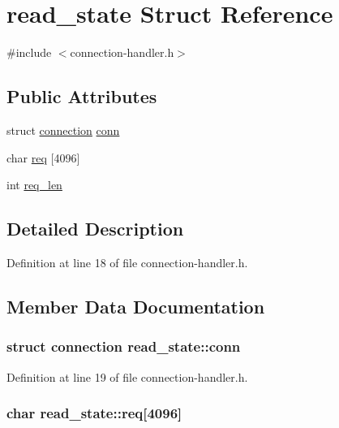 \hypertarget{structread__state}{\section{read\-\_\-state Struct Reference}
\label{structread__state}
}


{\ttfamily \#include $<$connection-\/handler.\-h$>$}

\subsection*{Public Attributes}
\begin{DoxyCompactItemize}
\item 
struct \hyperlink{structconnection}{connection} \hyperlink{structread__state_ad79008defc69c985f9a55b8f1a7dccb0}{conn}
\item 
char \hyperlink{structread__state_a5466de2b0a95c12c669ff082e4a228d0}{req} \mbox{[}4096\mbox{]}
\item 
int \hyperlink{structread__state_a5629ae045b84454938394c8af94124d1}{req\-\_\-len}
\end{DoxyCompactItemize}


\subsection{Detailed Description}


Definition at line 18 of file connection-\/handler.\-h.



\subsection{Member Data Documentation}
\hypertarget{structread__state_ad79008defc69c985f9a55b8f1a7dccb0}{
\subsubsection[{conn}]{\setlength{\rightskip}{0pt plus 5cm}struct {\bf connection} read\-\_\-state\-::conn}}\label{structread__state_ad79008defc69c985f9a55b8f1a7dccb0}


Definition at line 19 of file connection-\/handler.\-h.

\hypertarget{structread__state_a5466de2b0a95c12c669ff082e4a228d0}{
\subsubsection[{req}]{\setlength{\rightskip}{0pt plus 5cm}char read\-\_\-state\-::req\mbox{[}4096\mbox{]}}}\label{structread__state_a5466de2b0a95c12c669ff082e4a228d0}



